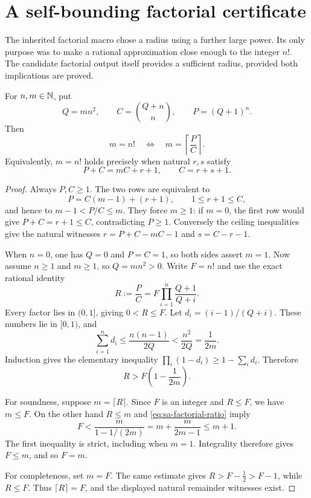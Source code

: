 \section{A self-bounding factorial certificate}
\label{sec:self-bounding-factorial}

The inherited factorial macro chose a radius using a further large
power.  Its only purpose was to make a rational approximation close
enough to the integer $n!$.  The candidate factorial output itself
provides a sufficient radius, provided both implications are proved.

\begin{theorem}
\label{thm:sa-factorial}
For $n,m\in\mathbb N$, put
\[
 Q=mn^2,\qquad C=\binom{Q+n}{n},\qquad P=(Q+1)^n.
\]
Then
\[
 m=n!\quad\Longleftrightarrow\quad
 m=\left\lceil\frac{P}{C}\right\rceil.
\]
Equivalently, $m=n!$ holds precisely when natural $r,s$ satisfy
\begin{equation}
 P+C=mC+r+1,\qquad C=r+s+1.
 \label{eq:sa-factorial-rows}
\end{equation}
\end{theorem}

\begin{proof}
Always $P,C\geq1$.  The two rows are equivalent to
\[
 P=C(m-1)+(r+1),\qquad 1\leq r+1\leq C,
\]
and hence to $m-1<P/C\leq m$.  They force $m\geq1$: if $m=0$,
the first row would give $P+C=r+1\leq C$, contradicting $P\geq1$.
Conversely the ceiling inequalities give the natural witnesses
$r=P+C-mC-1$ and $s=C-r-1$.

When $n=0$, one has $Q=0$ and $P=C=1$, so both sides assert $m=1$.
Now assume $n\geq1$ and $m\geq1$, so $Q=mn^2>0$.  Write $F=n!$
and use the exact rational identity
\[
 R:=\frac{P}{C}=F\prod_{i=1}^{n}\frac{Q+1}{Q+i}.
\]
Every factor lies in $(0,1]$, giving $0<R\leq F$.
Let $d_i=(i-1)/(Q+i)$.  These numbers lie in $[0,1)$, and
\[
 \sum_{i=1}^n d_i
 \leq\frac{n(n-1)}{2Q}
 <\frac{n^2}{2Q}=\frac{1}{2m}.
\]
Induction gives the elementary inequality
$\prod_i(1-d_i)\geq1-\sum_i d_i$.  Therefore
\begin{equation}
 R>F\left(1-\frac{1}{2m}\right).
 \label{eq:sa-factorial-ratio}
\end{equation}

For soundness, suppose $m=\lceil R\rceil$.  Since $F$ is an integer
and $R\leq F$, we have $m\leq F$.  On the other hand $R\leq m$
and \eqref{eq:sa-factorial-ratio} imply
\[
 F<\frac{m}{1-1/(2m)}
   =m+\frac{m}{2m-1}\leq m+1.
\]
The first inequality is strict, including when $m=1$.  Integrality
therefore gives $F\leq m$, and so $F=m$.

For completeness, set $m=F$.  The same estimate gives
$R>F-\tfrac12>F-1$, while $R\leq F$.  Thus $\lceil R\rceil=F$,
and the displayed natural remainder witnesses exist.
\end{proof}

